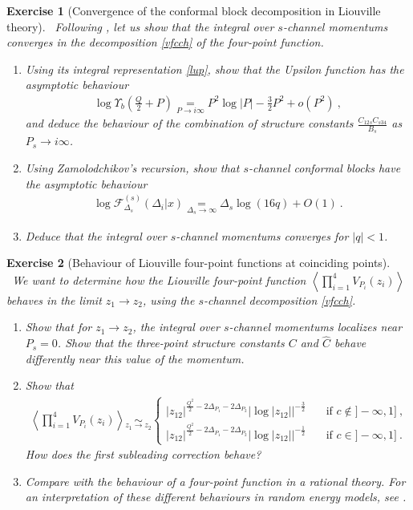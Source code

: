 \documentclass[12pt, a4paper, notitlepage, twoside]{report}
\numberwithin{equation}{section}
\theoremstyle{break}
\newtheorem{exo}{Exercise}[chapter]
\begin{document}
\begin{exo}[Convergence of the conformal block decomposition in Liouville theory]
 ~\label{exocvg}
 Following \cite{rs15}, let us show that the integral over $s$-channel momentums converges in the decomposition \eqref{vfcch} of the four-point function.
 \begin{enumerate}
  \item Using its integral representation \eqref{lup}, show that the Upsilon function has the asymptotic behaviour
  \begin{align}
   \log \Upsilon_b(\tfrac{Q}{2}+P) \underset{P\to i\infty}{=} P^2\log |P| -\frac32 P^2 + o(P^2)\ ,
  \end{align}
  and deduce the behaviour of the combination of structure constants $\frac{C_{12s}C_{s34}}{B_s}$ as $P_s\to i\infty$.
  \item Using Zamolodchikov's recursion, show that $s$-channel conformal blocks have the asymptotic behaviour
  \begin{align}
   \log\mathcal{F}_{\Delta_s}^{(s)}(\Delta_i|x) \underset{\Delta_s\to \infty}{=} \Delta_s\log(16q) + O(1)\ .
  \end{align}
  \item Deduce that the integral over $s$-channel momentums converges for $|q|<1$.
 \end{enumerate}
\end{exo}


\begin{exo}[Behaviour of Liouville four-point functions at coinciding points]
~\label{exo4a} 
We want to determine how the Liouville four-point function $\left<\prod_{i=1}^4 V_{P_i}(z_i)\right>$ behaves in the limit $z_1\to z_2$, using the $s$-channel decomposition \eqref{vfcch}.
\begin{enumerate}
 \item Show that for $z_1\to z_2$, the integral over $s$-channel momentums localizes near $P_s=0$. Show that the three-point structure constants $C$ and $\hat C$ behave differently near this value of the momentum.
 \item Show that 
 \begin{align}
  \left<\prod_{i=1}^4 V_{P_i}(z_i)\right> \underset{z_1\to z_2}{\sim} \left\{
  \begin{array}{ll} 
  |z_{12}|^{\frac{Q^2}{2} -2\Delta_{P_1}-2\Delta_{P_2}} \left|\log|z_{12}|\right|^{-\frac32} &\quad \text{if \ } c\notin ]-\infty,1]\ ,
  \\
  |z_{12}|^{\frac{Q^2}{2} -2\Delta_{P_1}-2\Delta_{P_2}} \left|\log|z_{12}|\right|^{-\frac12} &\quad \text{if \ } c\in ]-\infty,1]\ .
  \end{array}\right.
 \end{align}
How does the first subleading correction behave?
\item Compare with the behaviour of a four-point function in a rational theory. 
For an interpretation of these different behaviours in random energy models, see \cite{clrs16}.
\end{enumerate}
\end{exo}
\end{document}

